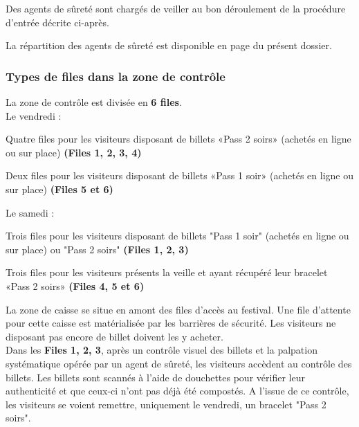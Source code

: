 \documentclass[hidelinks, paper=a4, fontsize=13pt]{report}
\begin{document}
Des agents de sûreté sont chargés de veiller au bon déroulement de la procédure d’entrée décrite ci-après.

La répartition des agents de sûreté est disponible en page \pageref{refRepartitionAgentsDeSurete} du présent dossier. 

\subsubsection{Types de files dans la zone de contrôle}

La zone de contrôle est divisée en \textbf{6 files}.\\

Le vendredi : 
\begin{list}{•}{}
	\item Quatre files pour les visiteurs disposant de billets «Pass 2 soirs» (achetés en ligne ou sur place) \textbf{(Files 1, 2, 3, 4)}
	\item Deux files pour les visiteurs disposant de billets «Pass 1 soir» (achetés en ligne ou sur place) \textbf{(Files 5 et 6)}\\
\end{list}

Le samedi :
\begin{list}{•}{} 
	\item Trois files pour les visiteurs disposant de billets "Pass 1 soir" (achetés en ligne ou sur place) ou "Pass 2 soirs" \textbf{(Files 1, 2, 3)}
	\item Trois files pour les visiteurs présents la veille et ayant récupéré leur bracelet «Pass 2 soirs» \textbf{(Files 4, 5 et 6)}\\
\end{list}

La zone de caisse se situe en amont des files d'accès au festival. Une file d'attente pour cette caisse est matérialisée par les barrières de sécurité. Les visiteurs ne disposant pas encore de billet doivent les y acheter.\\

Dans les \textbf{Files 1, 2, 3}, après un contrôle visuel des billets et la palpation systématique opérée par un agent de sûreté, les visiteurs accèdent au contrôle des billets. Les billets sont scannés à l’aide de douchettes pour vérifier leur authenticité et que ceux-ci n’ont pas déjà été compostés. A l'issue de ce contrôle, les visiteurs se voient remettre, uniquement le vendredi, un bracelet "Pass 2 soirs".\\
\end{document}

